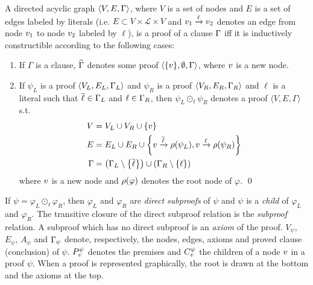\documentclass{llncs}
\begin{document}
\begin{definition}[Proof] 
\label{def:proof}
A directed acyclic graph $\langle V, E, \Gamma \rangle$, where $V$ is a set of nodes and $E$ is a
set of edges labeled by literals (i.e. $E \subset V \times \mathcal{L} \times V$ and $v_1
\xrightarrow{\ell} v_2$ denotes an edge from node $v_1$ to node $v_2$ labeled by $\ell$), is a
proof of a clause $\Gamma$ iff it is inductively constructible according to the following cases:
%
\begin{enumerate}
  \item If $\Gamma$ is a clause, $\widehat{\Gamma}$ denotes some proof $\langle \{ v \}, \emptyset ,
    \Gamma \rangle$, where $v$ is a new node.
  \item If $\psi_L$ is a proof $\langle V_L, E_L, \Gamma_L \rangle$ and
    $\psi_R$ is a proof $\langle V_R, E_R, \Gamma_R \rangle$ and $\ell$ is a literal such that
    $\overline{\ell} \in \Gamma_L$ and $\ell \in \Gamma_R$, then
    $\psi_L \odot_\ell \psi_R$ denotes a proof $\langle V, E, \Gamma \rangle$ s.t.
    \begin{align*}
      V &= V_L \cup V_R \cup \{v \} \\
      E &= E_L \cup E_R \cup
                    \left\{ v \xrightarrow{\overline{\ell}} \rho(\psi_L), v \xrightarrow{\ell} \rho(\psi_R) \right\} \\
     \Gamma &= \left( \Gamma_L \setminus \left\{ \overline{\ell} \right\} \right) \cup \left( \Gamma_R
                    \setminus \left\{ \ell \right\} \right)
    \end{align*}
    where $v$ is a new node and $\rho(\varphi)$ denotes the root node of $\varphi$.
  \qed
\end{enumerate}
\end{definition}


\newcommand{\Vertices}[1]{V_{#1}}
\newcommand{\Edges}[1]{E_{#1}}
\newcommand{\Conclusion}[1]{\clause_{#1}}
\newcommand{\Premises}[2]{P_{#1}^{#2}}
\newcommand{\Children}[2]{C_{#1}^{#2}}
\newcommand{\Axioms}[1]{A_{#1}}

\noindent
If $\psi = \varphi_L \odot_{\ell} \varphi_R$, then $\varphi_L$ and $\varphi_R$ are \emph{direct
subproofs} of $\psi$ and $\psi$ is a \emph{child} of $\varphi_L$ and $\varphi_R$. The
transitive closure of the direct subproof relation is the \emph{subproof} relation. A subproof which
has no direct subproof is an \emph{axiom} of the proof. 
%
$\Vertices{\psi}$, $\Edges{\psi}$, $\Axioms{\psi}$ and $\Conclusion{\psi}$
denote, respectively, the nodes, edges, axioms and proved clause (conclusion) of $\psi$. $\Premises{\n}{\psi}$ denotes the premises and $\Children{\n}{\psi}$ the children of a node $v$ in a proof $\psi$. When a proof is represented graphically, the root is drawn at the bottom and the axioms at the top.
\end{document}
